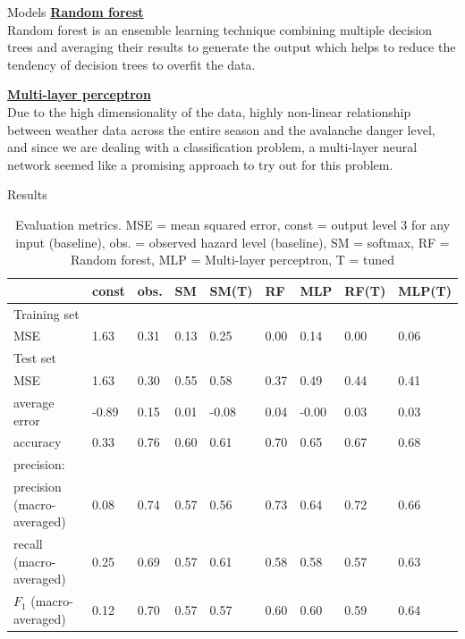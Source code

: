 \documentclass[final]{beamer}
\newlength{\colwidth}
\begin{document}
\begin{frame}[t]
\begin{columns}[t]
\begin{column}{\colwidth}
\begin{block}{Models}
 \underline{\textbf{Random forest}}\\
	 Random forest is an ensemble learning technique combining multiple decision trees and averaging their results to generate the output which helps to reduce the tendency of decision trees to overfit the data.

 \underline{\textbf{Multi-layer perceptron}}\\
Due to the high dimensionality of the data, highly non-linear relationship between weather data across the entire season and the avalanche danger level, and since we are dealing with a classification problem, a multi-layer neural network seemed like a promising approach to try out for this problem.

  \end{block}

  \begin{block}{Results}


    \begin{table}[H]
\caption{Evaluation metrics. MSE = mean squared error, 
const = output level 3 for any input (baseline), obs. = observed hazard level (baseline),
SM = softmax, RF = Random forest, MLP = Multi-layer perceptron, T = tuned}
\label{tbl:sais_eval}
\begin{tabular}{l*{8}{p{2.9cm}}}
\toprule
 & const  & obs.    & SM     & SM(T) & RF    & MLP    & RF(T)  & MLP(T) \\
\midrule
Training set &  &  &  &  &  &  &  &  \\
\midrule
MSE & 1.63 & 0.31  & 0.13 & 0.25 & 0.00 & 0.14 & 0.00 & 0.06 \\
\midrule
Test set &  &  &   &  &  &  &  &  \\
\midrule
MSE & 1.63 & 0.30  & 0.55 & 0.58 & 0.37 & 0.49 & 0.44 & 0.41 \\
average error & -0.89 & 0.15  & 0.01 & -0.08 & 0.04 & -0.00 & 0.03 & 0.03 \\
accuracy & 0.33 & 0.76  & 0.60 & 0.61 & 0.70 & 0.65 & 0.67 & 0.68 \\
precision: &  &  &    &  &  &  &  &  \\
precision (macro-averaged) & 0.08 & 0.74  & 0.57 & 0.56 & 0.73 & 0.64 & 0.72 & 0.66 \\
recall (macro-averaged) & 0.25 & 0.69  & 0.57 & 0.61 & 0.58 & 0.58 & 0.57 & 0.63 \\
$F_1$ (macro-averaged) & 0.12 & 0.70  & 0.57 & 0.57 & 0.60 & 0.60 & 0.59 & 0.64 \\
\bottomrule
\end{tabular}
\end{table}


\end{block}
\end{column}
\end{columns}
\end{frame}
\end{document}
